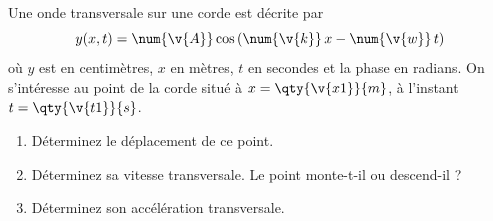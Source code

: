 Une onde transversale sur une corde est décrite par
\[ y(x,t) = \num{\v{A}}\cos\left(\num{\v{k}}\,x - \num{\v{w}}\,t\right) \]
où $y$ est en centimètres, $x$ en mètres, $t$ en secondes et la phase en radians. On s'intéresse au point de la corde situé à $x = \qty{\v{x1}}{m}$, à l'instant $t = \qty{\v{t1}}{s}$.

\begin{enumerate}[label=\alph*)]
    \item Déterminez le déplacement de ce point.
    \item Déterminez sa vitesse transversale. Le point monte-t-il ou descend-il ?
    \item Déterminez son accélération transversale.
\end{enumerate}
